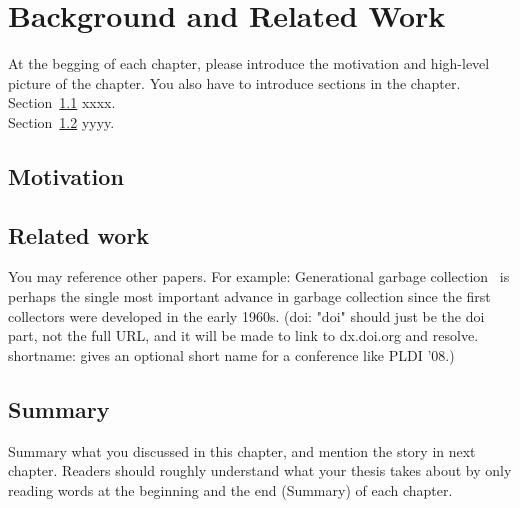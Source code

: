 \chapter{Background and Related Work}
\label{cha:background}
At the begging of each chapter, please introduce the motivation and high-level
picture of the chapter. You also have to introduce sections in the
chapter. \\


Section~\ref{sec:motivation} xxxx.\\

Section~\ref{sec:relatedwork} yyyy.\\

\section{Motivation}
\label{sec:motivation}

\section{Related work}
\label{sec:relatedwork}
You may reference other papers. For example: 
Generational garbage collection~\citep{LH:83,Moon:84,Ungar:84} is perhaps the
single most important advance in garbage collection since the first collectors
were developed in the early 1960s. (doi: "doi" should just be the doi part, not
the full URL, and it will be made to link to dx.doi.org and resolve.
shortname: gives an optional short name for a conference like PLDI '08.)





\section{Summary}
Summary what you discussed in this chapter, and mention the story in next
chapter. Readers should roughly understand what your thesis takes about by only reading
words at the beginning and the end (Summary) of each chapter.



